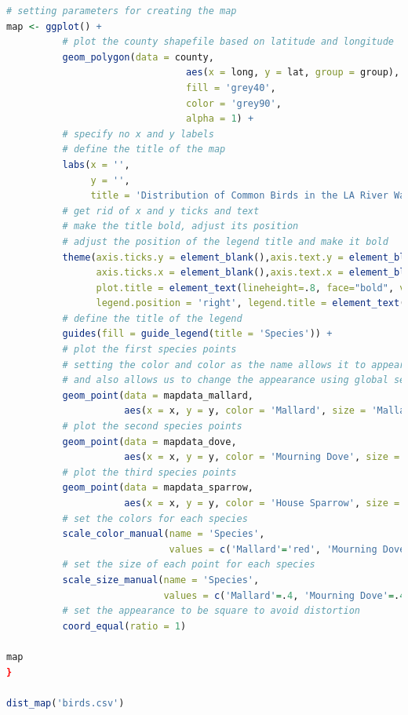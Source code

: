 \documentclass[letterpaper]{article}
\begin{document}
\begin{lstlisting}[language=R]
    # setting parameters for creating the map
map <- ggplot() +
          # plot the county shapefile based on latitude and longitude
          geom_polygon(data = county,
                                aes(x = long, y = lat, group = group),
                                fill = 'grey40',
                                color = 'grey90',
                                alpha = 1) +
          # specify no x and y labels
          # define the title of the map
          labs(x = '',
               y = '', 
               title = 'Distribution of Common Birds in the LA River Watershed') +
          # get rid of x and y ticks and text
          # make the title bold, adjust its position
          # adjust the position of the legend title and make it bold
          theme(axis.ticks.y = element_blank(),axis.text.y = element_blank(),
                axis.ticks.x = element_blank(),axis.text.x = element_blank(),
                plot.title = element_text(lineheight=.8, face="bold", vjust=1, hjust = .5),
                legend.position = 'right', legend.title = element_text(face = 'bold')) +
          # define the title of the legend
          guides(fill = guide_legend(title = 'Species')) +
          # plot the first species points
          # setting the color and color as the name allows it to appear on the legend
          # and also allows us to change the appearance using global setting
          geom_point(data = mapdata_mallard,
                     aes(x = x, y = y, color = 'Mallard', size = 'Mallard')) +
          # plot the second species points
          geom_point(data = mapdata_dove,
                     aes(x = x, y = y, color = 'Mourning Dove', size = 'Mourning Dove')) +
          # plot the third species points
          geom_point(data = mapdata_sparrow,
                     aes(x = x, y = y, color = 'House Sparrow', size = 'House Sparrow')) +
          # set the colors for each species
          scale_color_manual(name = 'Species',
                             values = c('Mallard'='red', 'Mourning Dove'='blue', 'House Sparrow'='yellow')) +
          # set the size of each point for each species
          scale_size_manual(name = 'Species',
                            values = c('Mallard'=.4, 'Mourning Dove'=.4, 'House Sparrow'=.4)) +
          # set the appearance to be square to avoid distortion
          coord_equal(ratio = 1)

map          
}    

dist_map('birds.csv')
\end{lstlisting}
\end{document}
